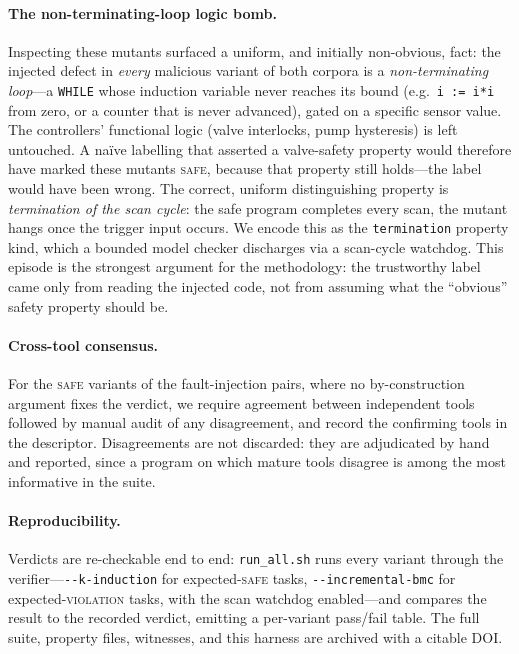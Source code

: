 \paragraph{The non-terminating-loop logic bomb.}
Inspecting these mutants surfaced a uniform, and initially non-obvious, fact: the
injected defect in \emph{every} malicious variant of both corpora is a
\emph{non-terminating loop}---a \texttt{WHILE} whose induction variable never reaches
its bound (e.g.\ \texttt{i := i*i} from zero, or a counter that is never advanced),
gated on a specific sensor value. The controllers' functional logic (valve
interlocks, pump hysteresis) is left untouched. A na\"ive labelling that asserted a
valve-safety property would therefore have marked these mutants \textsc{safe}, because
that property still holds---the label would have been wrong. The correct, uniform
distinguishing property is \emph{termination of the scan cycle}: the safe program
completes every scan, the mutant hangs once the trigger input occurs. We encode this
as the \texttt{termination} property kind, which a bounded model checker discharges via
a scan-cycle watchdog. This episode is the strongest argument for the methodology:
the trustworthy label came only from reading the injected code, not from assuming what
the ``obvious'' safety property should be.

\paragraph{Cross-tool consensus.}
For the \textsc{safe} variants of the fault-injection pairs, where no by-construction
argument fixes the verdict, we require agreement between independent tools followed by
manual audit of any disagreement, and record the confirming tools in the descriptor.
Disagreements are not discarded: they are adjudicated by hand and reported, since a
program on which mature tools disagree is among the most informative in the suite.

\paragraph{Reproducibility.}
Verdicts are re-checkable end to end: \texttt{run\_all.sh} runs every variant through
the verifier---\texttt{-{}-k-induction} for expected-\textsc{safe} tasks,
\texttt{-{}-incremental-bmc} for expected-\textsc{violation} tasks, with the scan
watchdog enabled---and compares the result to the recorded verdict, emitting a
per-variant pass/fail table. The full suite, property files, witnesses, and this
harness are archived with a citable DOI.

